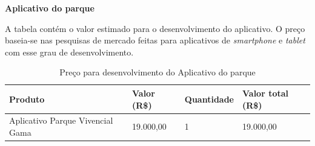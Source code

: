 \textbf{Aplicativo do parque}

A tabela contém o valor estimado para o desenvolvimento do aplicativo. O preço baseia-se nas pesquisas de mercado feitas para aplicativos de \textit{smartphone} e \textit{tablet} com esse grau de desenvolvimento.
\begin{table}[h]
\centering
\caption{Preço para desenvolvimento do Aplicativo do parque}
\label{precoAplicativo}
\begin{tabular}{|l|l|l|l|}
\hline
Produto                          & Valor (R\$) & Quantidade & Valor total (R\$) \\ \hline
Aplicativo Parque Vivencial Gama & 19.000,00   & 1          & 19.000,00         \\ \hline
\end{tabular}
\end{table}